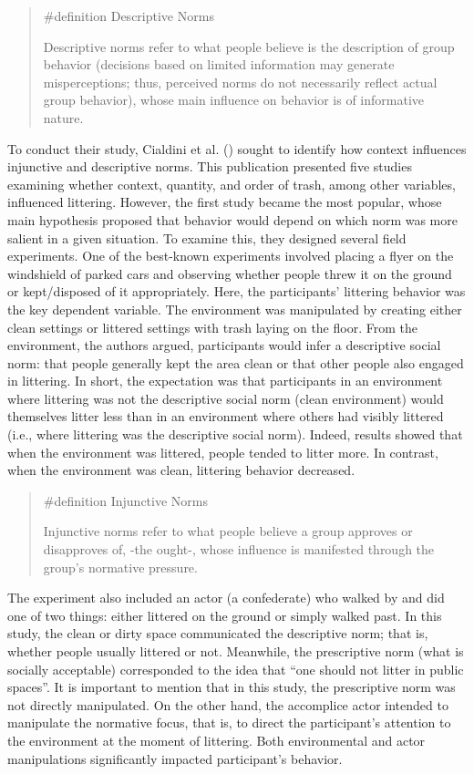 \documentclass[
  letterpaper,
]{book}
\begin{document}
\begin{quote}
\label{def-descriptivenorms}{\#definition} Descriptive
Norms

Descriptive norms refer to what people believe is the description of
group behavior (decisions based on limited information may generate
misperceptions; thus, perceived norms do not necessarily reflect actual
group behavior), whose main influence on behavior is of informative
nature.
\end{quote}

To conduct their study, Cialdini et al.
() sought to identify how
context influences injunctive and descriptive norms. This publication
presented five studies examining whether context, quantity, and order of
trash, among other variables, influenced littering. However, the first
study became the most popular, whose main hypothesis proposed that
behavior would depend on which norm was more salient in a given
situation. To examine this, they designed several field experiments. One
of the best-known experiments involved placing a flyer on the windshield
of parked cars and observing whether people threw it on the ground or
kept/disposed of it appropriately. Here, the participants' littering
behavior was the key dependent variable. The environment was manipulated
by creating either clean settings or littered settings with trash laying
on the floor. From the environment, the authors argued, participants
would infer a descriptive social norm: that people generally kept the
area clean or that other people also engaged in littering. In short, the
expectation was that participants in an environment where littering was
not the descriptive social norm (clean environment) would themselves
litter less than in an environment where others had visibly littered
(i.e., where littering was the descriptive social norm). Indeed, results
showed that when the environment was littered, people tended to litter
more. In contrast, when the environment was clean, littering behavior
decreased.

\begin{quote}
\label{def-injunctivenorms}{\#definition} Injunctive
Norms

Injunctive norms refer to what people believe a group approves or
disapproves of, -the ought-, whose influence is manifested through the
group's normative pressure.
\end{quote}

The experiment also included an actor (a confederate) who walked by and
did one of two things: either littered on the ground or simply walked
past. In this study, the clean or dirty space communicated the
descriptive norm; that is, whether people usually littered or not.
Meanwhile, the prescriptive norm (what is socially acceptable)
corresponded to the idea that ``one should not litter in public
spaces''. It is important to mention that in this study, the
prescriptive norm was not directly manipulated. On the other hand, the
accomplice actor intended to manipulate the normative focus, that is, to
direct the participant's attention to the environment at the moment of
littering. Both environmental and actor manipulations significantly
impacted participant's behavior.
\end{document}
